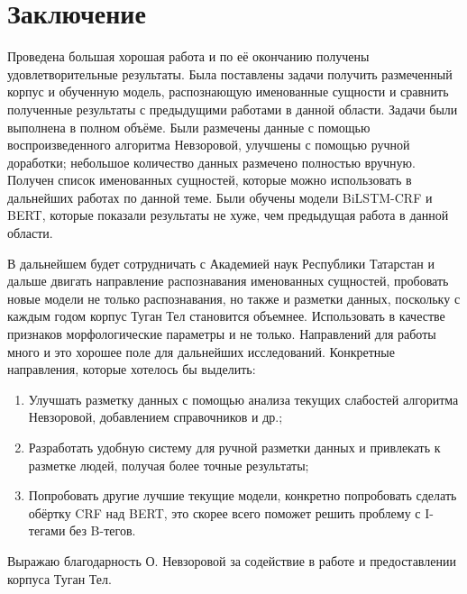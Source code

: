 \section{Заключение}

Проведена большая хорошая работа и по её окончанию получены удовлетворительные результаты. Была поставлены задачи получить размеченный корпус и обученную модель, распознающую именованные сущности и сравнить полученные результаты с предыдущими работами в данной области. Задачи были выполнена в полном объёме. Были размечены данные с помощью воспроизведенного алгоритма Невзоровой, улучшены с помощью ручной доработки; небольшое количество данных размечено полностью вручную. Получен список именованных сущностей, которые можно использовать в дальнейших работах по данной теме. Были обучены модели BiLSTM-CRF и BERT, которые показали результаты не хуже, чем предыдущая работа в данной области. 

В дальнейшем будет сотрудничать с Академией наук Республики Татарстан и дальше двигать направление распознавания именованных сущностей, пробовать новые модели не только распознавания, но также и разметки данных, поскольку с каждым годом корпус Туган Тел становится объемнее. Использовать в качестве признаков морфологические параметры и не только. Направлений для работы много и это хорошее поле для дальнейших исследований. Конкретные направления, которые хотелось бы выделить:

\begin{enumerate}
\item Улучшать разметку данных с помощью анализа текущих слабостей алгоритма Невзоровой, добавлением справочников и др.; 
\item Разработать удобную систему для ручной разметки данных и привлекать к разметке людей, получая более точные результаты;
\item Попробовать другие лучшие текущие модели, конкретно попробовать сделать обёртку CRF над BERT, это скорее всего поможет решить проблему с I-тегами без B-тегов.
\end{enumerate}

Выражаю благодарность О. Невзоровой за содействие в работе и предоставлении корпуса Туган Тел.